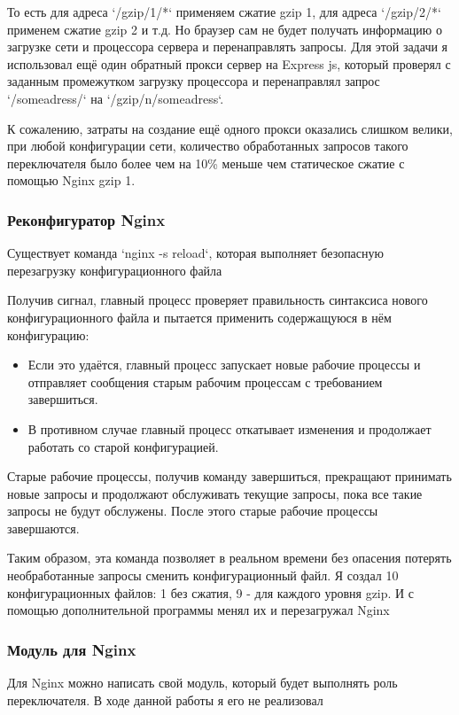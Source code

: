 \documentclass[12pt]{article}
\begin{document}
То есть для адреса `/gzip/1/*` применяем сжатие gzip 1, для адреса `/gzip/2/*` применем сжатие gzip 2 и т.д. Но браузер сам не будет получать информацию о загрузке сети и процессора сервера и перенаправлять запросы. Для этой задачи я использовал ещё один обратный прокси сервер на Express js, который проверял с заданным промежутком загрузку процессора и перенаправлял запрос `/someadress/` на `/gzip/n/someadress`.

К сожалению, затраты на создание ещё одного прокси оказались слишком велики, при любой конфигурации сети, количество обработанных запросов такого переключателя было более чем на 10\% меньше чем статическое сжатие с помощью Nginx gzip 1.

\subsubsection{Реконфигуратор Nginx }

Существует команда `nginx -s reload`, которая выполняет безопасную перезагрузку конфигурационного файла

Получив сигнал, главный процесс проверяет правильность синтаксиса нового конфигурационного файла и пытается применить содержащуюся в нём конфигурацию:
\begin{itemize}
    \item Если это удаётся, главный процесс запускает новые рабочие процессы и отправляет сообщения старым рабочим процессам с требованием завершиться.
    \item В противном случае главный процесс откатывает изменения и продолжает работать со старой конфигурацией.
\end{itemize}

Старые рабочие процессы, получив команду завершиться, прекращают принимать новые запросы и продолжают обслуживать текущие запросы, пока все такие запросы не будут обслужены. После этого старые рабочие процессы завершаются.

Таким образом, эта команда позволяет в реальном времени без опасения потерять необработанные запросы сменить конфигурационный файл. Я создал 10 конфигурационных файлов: 1 без сжатия, 9 - для каждого уровня gzip. И с помощью дополнительной
программы менял их и перезагружал Nginx

\subsubsection{Модуль для Nginx}

Для Nginx можно написать свой модуль, который будет выполнять роль переключателя. В ходе данной работы я его не реализовал
\end{document}
